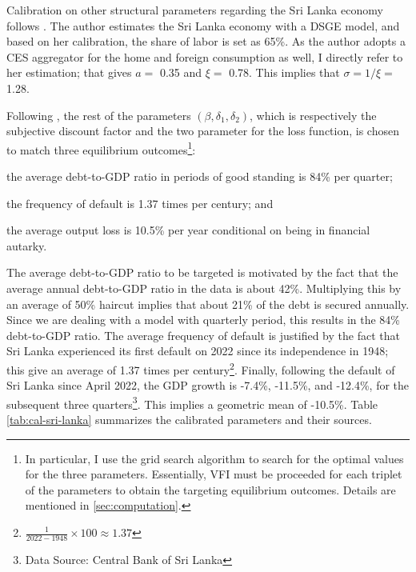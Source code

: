 Calibration on other structural parameters regarding the Sri Lanka economy follows \citet*{Jegajeevan-Sri-Lanka-DSGE}. The author estimates the Sri Lanka economy with a DSGE model, and based on her calibration, the share of labor is set as 65\%. As the author adopts a CES aggregator for the home and foreign consumption as well, I directly refer to her estimation; that gives $a =$ 0.35 and $\xi=$ 0.78\footnotemark{}.
This implies that $\sigma = 1/\xi = $ 1.28.


Following \citet{Na-18}, the rest of the parameters $\left( \beta, \delta_1, \delta_2 \right)$, which is respectively the subjective discount factor and the two parameter for the loss function, is chosen to match three equilibrium outcomes\footnote{
    In particular, I use the grid search algorithm to search for the optimal values for the three parameters. Essentially, VFI must be proceeded for each triplet of the parameters to obtain the targeting equilibrium outcomes. Details are mentioned in \autoref{sec:computation}.
}:
\begin{enumerate*}[label = (\roman*)]
    \item the average debt-to-GDP ratio in periods of good standing is 84\% per quarter;
    \item the frequency of default is 1.37 times per century; and
    \item the average output loss is 10.5\% per year conditional on being in financial autarky.
\end{enumerate*}
The average debt-to-GDP ratio to be targeted is motivated by the fact that the average annual debt-to-GDP ratio in the data is about 42\%\footnotemark{}.
Multiplying this by an average of 50\% haircut implies that about 21\% of the debt is secured annually\footnotemark{}.
Since we are dealing with a model with quarterly period, this results in the 84\% debt-to-GDP ratio.
The average frequency of default is justified by the fact that Sri Lanka experienced its first default on 2022 since its independence in 1948; this give an average of 1.37 times per century\footnote{$\frac{1}{2022-1948} \times 100 \approx 1.37$}. Finally, following the default of Sri Lanka since April 2022, the GDP growth is -7.4\%, -11.5\%, and -12.4\%, for the subsequent three quarters\footnote{Data Source: Central Bank of Sri Lanka}. This implies a geometric mean of -10.5\%.
Table \ref{tab:cal-sri-lanka} summarizes the calibrated parameters and their sources.

